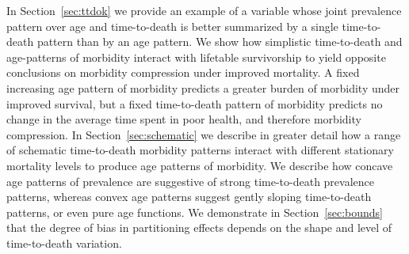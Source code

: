 \documentclass[12pt,oneside,letterpaper,doublespacing]{article}  %
\begin{document}
In Section~\ref{sec:ttdok} we provide an example of a variable whose joint prevalence pattern over age and time-to-death is better summarized by a single time-to-death pattern than by an age pattern. We show how simplistic time-to-death and age-patterns of morbidity interact with lifetable survivorship to yield opposite conclusions on morbidity compression under improved mortality. A fixed increasing age pattern of morbidity predicts a greater burden of morbidity under improved survival, but a fixed time-to-death pattern of morbidity predicts no change in the average time spent in poor health, and therefore morbidity compression. In Section~\ref{sec:schematic} we describe in greater detail how a range of schematic time-to-death morbidity patterns interact with different stationary mortality levels to produce age patterns of morbidity. We describe how concave age patterns of prevalence are suggestive of strong time-to-death prevalence patterns, whereas convex age patterns suggest gently sloping time-to-death patterns, or even pure age functions.  We demonstrate in Section~\ref{sec:bounds} that the degree of bias in partitioning effects depends on the shape and level of time-to-death variation. 



\newpage%

\end{document}
